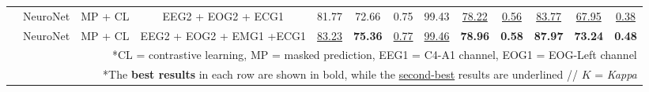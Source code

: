 \begin{table*}[!htbp]
{{\begin{tabular}{c|c|c|c|ccc|ccc|ccc}
                                                                                       & NeuroNet                                                                                          & MP
  + CL                                                                                               & EEG2 + EOG2 + ECG1                  & 81.77          & 72.66          & 0.75                                                                     & 99.43          & \uline{78.22}  & \uline{0.56}                                                  & \uline{83.77}  & \uline{67.95}  & \uline{0.38}                                                      \\
                                                                                       & NeuroNet                                                                                          & MP
  + CL                                                                                               & EEG2 + EOG2 + EMG1 +ECG1            & \uline{83.23}  & \textbf{75.36} & \uline{0.77}                                                             & \uline{99.46}  & \textbf{78.96} & \textbf{0.58}                                                 & \textbf{87.97} & \textbf{73.24} & \textbf{0.48}                                                     \\
\hline
\multicolumn{13}{r}{*CL = contrastive learning, MP = masked prediction, EEG1 = C4-A1 channel, EOG1 = EOG-Left channel} \\
\multicolumn{13}{r}{*The \textbf{best results} in each row are shown in bold, while the \uline{second-best} results are underlined // $K$ = \textit{Kappa}} \\
\end{tabular}}
}
\vspace{-3.5mm}
\end{table*}